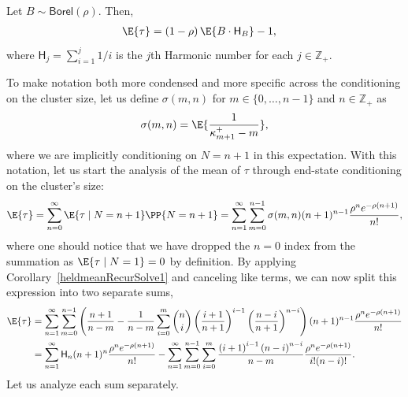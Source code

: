 \begin{theorem}\label{heldmeanIdThm1}
Let $B \sim \mathsf{Borel}(\rho)$. Then,
\begin{align}
\E{\tau}
&=
\left(1-\rho\right)
\E{B \cdot \mathsf{H}_B}
-
1
,
\end{align}
where $\mathsf{H}_j = \sum_{i=1}^j 1/i$ is the $j$th Harmonic number for each $j \in \mathbb{Z}_+$.
\end{theorem}
To make notation both more condensed and more specific across the conditioning on the cluster size, let us define $\sigma(m,n)$ for $m \in \{0, \dots, n - 1\}$ and $n \in \mathbb{Z}_+$ as
\begin{align}
\sigma(m,n)
=
\E{\frac{1}{\kappa_{m+1}^+-m}}
,
\end{align}
where we are implicitly conditioning on $N=n+1$ in this expectation. With this notation, let us start the analysis of the mean of $\tau$ through end-state conditioning on the cluster's size:
\begin{align}
\E{\tau}
=
\sum_{n=0}^\infty \E{\tau \mid N = n+1}\PP{N=n+1}
=
\sum_{n=1}^\infty \sum_{m=0}^{n-1} \sigma(m,n)  (n+1)^{n-1} \frac{\rho^n e^{-\rho(n+1)}}{n!} 
,
\end{align}
where one should notice that we have dropped the $n=0$ index from the summation as $\E{\tau \mid N = 1} = 0$ by definition. By applying Corollary~\ref{heldmeanRecurSolve1} and canceling like terms, we can now split this expression into two separate sums,
\begin{align}
\E{\tau}
&=
\sum_{n=1}^\infty 
\sum_{m=0}^{n-1}
\left(
\frac{n+1}{n-m}
-
\frac{1}{n-m}
\sum_{i=0}^m
{n \choose i}
\left(\frac{i+1}{n+1}\right)^{i-1}
\left(\frac{n-i}{n+1}\right)^{n-i}
\right)
(n+1)^{n-1} \frac{\rho^n e^{-\rho(n+1)}}{n!}
\\
&=
\sum_{n=1}^\infty 
\mathsf{H}_n (n+1)^{n} \frac{\rho^n e^{-\rho(n+1)}}{n!}
-
\sum_{n=1}^\infty
\sum_{m=0}^{n-1}
\sum_{i=0}^m
\frac{\left({i+1}\right)^{i-1}
\left({n-i}\right)^{n-i}}{n-m}
 \frac{\rho^n e^{-\rho(n+1)}}{i!(n-i)!}
 .
 \label{heldtwoSumEq1}
\end{align}
Let us analyze each sum separately. 

